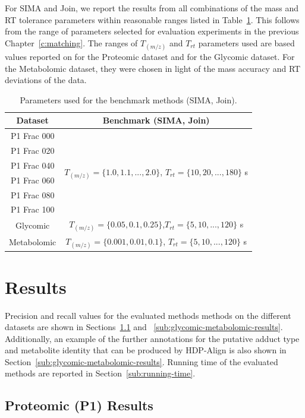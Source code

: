 For SIMA and Join, we report the results from all combinations of the mass and RT tolerance parameters within reasonable ranges listed in Table~\ref{tab:hdp-parameters-benchmark}. This follows from the range of parameters selected for evaluation experiments in the previous Chapter~\ref{c:matching}. The ranges of $T_{(m/z)}$ and $T_{rt}$ parameters used are based values reported on \cite{Lange2008} for the Proteomic dataset and \cite{Tsai2013a} for the Glycomic dataset. For the Metabolomic dataset, they were chosen in light of the mass accuracy and RT deviations of the data.

\begin{table}[!htbp]
\begin{centering}
\begin{tabular}{|c|c|}
\hline 
Dataset & Benchmark (SIMA, Join)\tabularnewline
\hline 
\hline 
P1 Frac 000 & \multirow{6}{*}{$T_{(m/z)}=\{1.0,1.1,...,2.0\}$, $T{}_{rt}=\{10,20,...,180\}$ s}\tabularnewline
\cline{1-1} 
P1 Frac 020 & \tabularnewline
\cline{1-1} 
P1 Frac 040 & \tabularnewline
\cline{1-1} 
P1 Frac 060 & \tabularnewline
\cline{1-1} 
P1 Frac 080 & \tabularnewline
\cline{1-1} 
P1 Frac 100 & \tabularnewline
\hline 
Glycomic & $T_{(m/z)}=\{0.05,0.1,0.25\}$,$T{}_{rt}=\{5,10,...,120\}$ s\tabularnewline
\hline 
Metabolomic & $T_{(m/z)}=\{0.001,0.01,0.1\}$, $T{}_{rt}=\{5,10,...,120\}$ s\tabularnewline
\hline 
\end{tabular}
\par\end{centering}
\caption{Parameters used for the benchmark methods (SIMA, Join).\label{tab:hdp-parameters-benchmark}}
\end{table}

\section{Results}

Precision and recall values for the evaluated methods methods on the different datasets are shown in Sections~\ref{sub:proteomic-results} and ~\ref{sub:glycomic-metabolomic-results}. Additionally, an example of the further annotations for the putative adduct type and metabolite identity that can be produced by HDP-Align is also shown in Section~\ref{sub:glycomic-metabolomic-results}. Running time of the evaluated methods are reported in Section~\ref{sub:running-time}.

\subsection{Proteomic (P1) Results}
\label{sub:proteomic-results}


